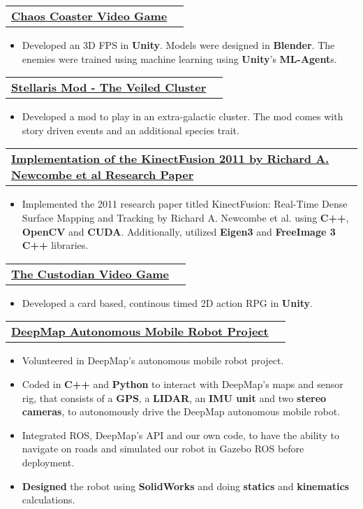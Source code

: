 \documentclass[letterpaper,11pt]{article}
\makeatletter
\newcommand{\resumeItem}[1]{
  \item\small{
    {#1 \vspace{-2pt}}
  }
}
\newcommand{\resumeProjectHeading}[2]{
    \item
    \begin{tabular*}{1.001\textwidth}{l@{\extracolsep{\fill}}r}
      \small#1 & \textbf{\small #2}\\
    \end{tabular*}\vspace{-7pt}
}
\newcommand{\resumeItemListStart}{\begin{itemize}}
\newcommand{\resumeItemListEnd}{\end{itemize}\vspace{-5pt}}
\makeatother
\begin{document}
  \vspace{-13pt}  
  \resumeProjectHeading
    {\textbf{\href{https://github.com/Popichi/chaos_coaster_video_game}{\color{blue}Chaos Coaster Video Game}}} {}
    \resumeItemListStart
      \resumeItem{Developed an 3D FPS in \textbf{Unity}. Models were designed in \textbf{Blender}. The enemies were trained using machine learning using \textbf{Unity}'s \textbf{ML-Agent}s.}
    \resumeItemListEnd

  \vspace{-13pt}
  \resumeProjectHeading
    {\textbf{\href{https://github.com/Popichi/my_stellaris_mods/tree/main/the_veiled_cluster_mod}{\color{blue}Stellaris Mod - The Veiled Cluster}}} {}
    \resumeItemListStart
      \resumeItem{Developed a mod to play in an extra-galactic cluster. The mod comes with story driven events and an additional species trait.}
    \resumeItemListEnd 

  \vspace{-13pt}
  \resumeProjectHeading
    {\textbf{\href{https://github.com/Popichi/implementation_of_the_kinectfusion_2011_paper}{\color{blue}Implementation of the KinectFusion 2011 by Richard A. Newcombe et al Research Paper}}} {}
    \resumeItemListStart
      \resumeItem{Implemented the 2011 research paper titled KinectFusion: Real-Time Dense Surface Mapping and Tracking by Richard A. Newcombe et al. using \textbf{C++}, \textbf{OpenCV} and \textbf{CUDA}. Additionally, utilized \textbf{Eigen3} and \textbf{FreeImage 3} \textbf{C++} libraries.}
    \resumeItemListEnd 

  \vspace{-13pt}
  \resumeProjectHeading
    {\textbf{\href{https://github.com/Popichi/the_custodian_video_game}{\color{blue}The Custodian Video Game}}} {}
    \resumeItemListStart
      \resumeItem{Developed a card based, continous timed 2D action RPG in \textbf{Unity}.}
    \resumeItemListEnd 

  \vspace{-13pt}
  \resumeProjectHeading
    {\textbf{\href{https://github.com/Hershey988/deepmap_api}{\color{blue}DeepMap Autonomous Mobile Robot Project}}} {}
    \resumeItemListStart
      \resumeItem{Volunteered in DeepMap's autonomous mobile robot project.}
      \resumeItem{Coded in \textbf{C++} and \textbf{Python} to interact with DeepMap’s maps and sensor rig, that consists of a \textbf{GPS}, a \textbf{LIDAR}, an \textbf{IMU unit} and two \textbf{stereo cameras}, to autonomously drive the DeepMap autonomous mobile robot.}
      \resumeItem{Integrated ROS, DeepMap’s API and our own code, to have the ability to navigate on roads and simulated our robot in Gazebo ROS before deployment.}
      \resumeItem{\textbf{Designed} the robot using \textbf{SolidWorks} and doing \textbf{statics} and \textbf{kinematics} calculations.}
    \resumeItemListEnd
    
\end{document}
